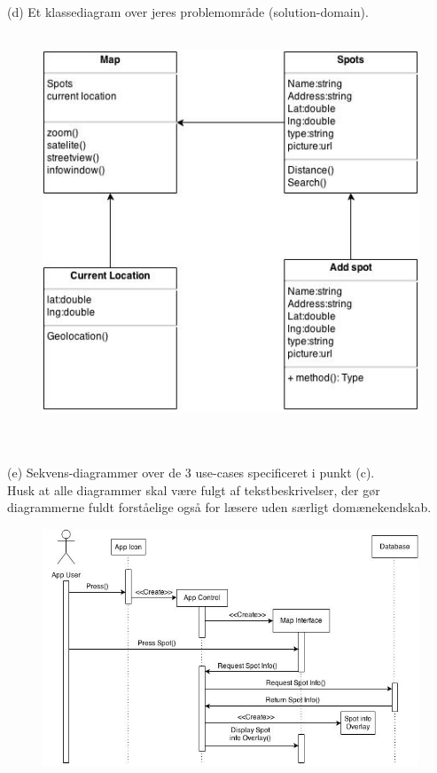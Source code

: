 \documentclass[12pt]{article}
\begin{document}
(d) Et klassediagram over jeres problemområde (solution-domain).\\\\
\begin{figure}[h]
\includegraphics[scale = 0.5]{cd}
\end{figure}\\\\
\newpage
(e) Sekvens-diagrammer over de 3 use-cases specificeret i punkt (c).\\
Husk at alle diagrammer skal være fulgt af tekstbeskrivelser, der gør diagrammerne fuldt
forståelige også for læsere uden særligt domænekendskab.\\
\begin{figure}[h]
\includegraphics[scale = 0.5]{sekdia1}
\end{figure}
\end{document}
